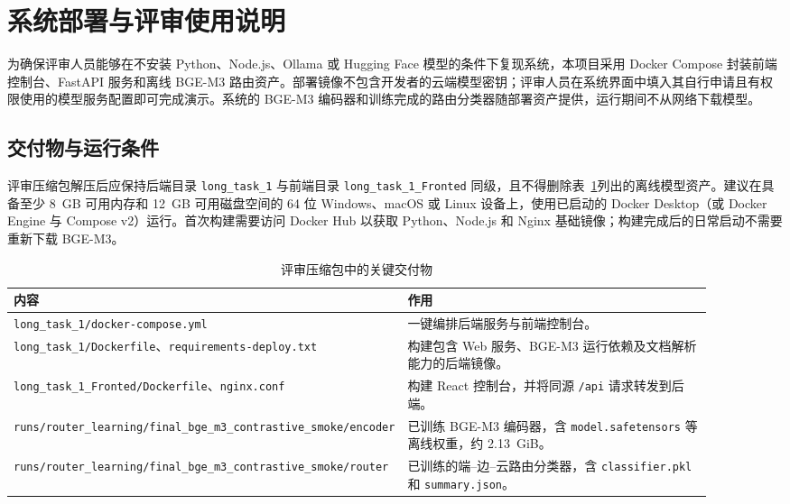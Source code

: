 \section{系统部署与评审使用说明}
\label{sec:judge-deployment}

为确保评审人员能够在不安装 Python、Node.js、Ollama 或 Hugging Face 模型的条件下复现系统，本项目采用 Docker Compose 封装前端控制台、FastAPI 服务和离线 BGE-M3 路由资产。部署镜像不包含开发者的云端模型密钥；评审人员在系统界面中填入其自行申请且有权限使用的模型服务配置即可完成演示。系统的 BGE-M3 编码器和训练完成的路由分类器随部署资产提供，运行期间不从网络下载模型。

\subsection{交付物与运行条件}

评审压缩包解压后应保持后端目录 \texttt{long\_task\_1} 与前端目录 \texttt{long\_task\_1\_Fronted} 同级，且不得删除表~\ref{tab:judge-assets}列出的离线模型资产。建议在具备至少 8~GB 可用内存和 12~GB 可用磁盘空间的 64 位 Windows、macOS 或 Linux 设备上，使用已启动的 Docker Desktop（或 Docker Engine 与 Compose v2）运行。首次构建需要访问 Docker Hub 以获取 Python、Node.js 和 Nginx 基础镜像；构建完成后的日常启动不需要重新下载 BGE-M3。

\begin{table}[htbp]
\centering
\caption{评审压缩包中的关键交付物}
\label{tab:judge-assets}
\begin{tabular}{p{0.35\linewidth}p{0.55\linewidth}}
\toprule
内容 & 作用 \\
\midrule
\texttt{long\_task\_1/docker-compose.yml} & 一键编排后端服务与前端控制台。 \\
\texttt{long\_task\_1/Dockerfile}、\texttt{requirements-deploy.txt} & 构建包含 Web 服务、BGE-M3 运行依赖及文档解析能力的后端镜像。 \\
\texttt{long\_task\_1\_Fronted/Dockerfile}、\texttt{nginx.conf} & 构建 React 控制台，并将同源 \texttt{/api} 请求转发到后端。 \\
\texttt{runs/router\_learning/final\_bge\_m3\_contrastive\_smoke/encoder} & 已训练 BGE-M3 编码器，含 \texttt{model.safetensors} 等离线权重，约 2.13~GiB。 \\
\texttt{runs/router\_learning/final\_bge\_m3\_contrastive\_smoke/router} & 已训练的端--边--云路由分类器，含 \texttt{classifier.pkl} 和 \texttt{summary.json}。 \\
\bottomrule
\end{tabular}
\end{table}


